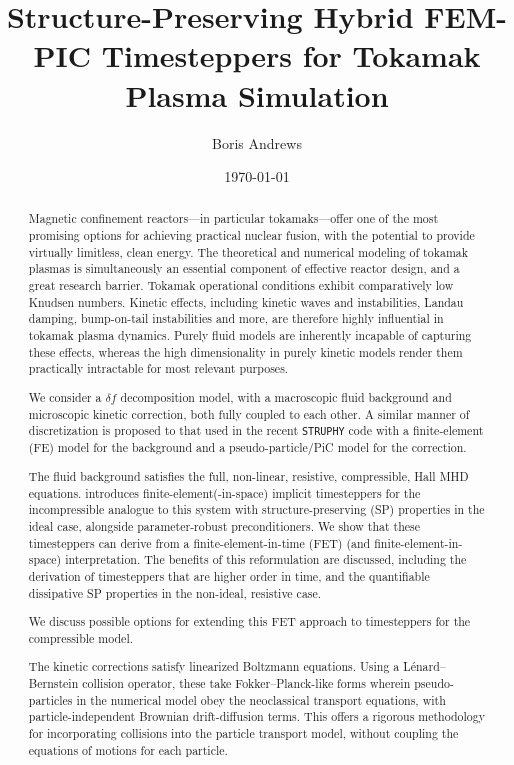\documentclass[12pt, a4paper]{report}
\title{Structure-Preserving Hybrid FEM-PIC Timesteppers for Tokamak Plasma Simulation}
\author{Boris Andrews}
\affil{Mathematical Institute, University of Oxford}
\date{\today}
\begin{document}
    \maketitle
    
    
    \begin{abstract}
        Magnetic confinement reactors---in particular tokamaks---offer one of the most promising options for achieving practical nuclear fusion, with the potential to provide virtually limitless, clean energy. The theoretical and numerical modeling of tokamak plasmas is simultaneously an essential component of effective reactor design, and a great research barrier. Tokamak operational conditions exhibit comparatively low Knudsen numbers. Kinetic effects, including kinetic waves and instabilities, Landau damping, bump-on-tail instabilities and more, are therefore highly influential in tokamak plasma dynamics. Purely fluid models are inherently incapable of capturing these effects, whereas the high dimensionality in purely kinetic models render them practically intractable for most relevant purposes.

        We consider a $\delta\!f$ decomposition model, with a macroscopic fluid background and microscopic kinetic correction, both fully coupled to each other. A similar manner of discretization is proposed to that used in the recent {\tt STRUPHY} code \cite{Holderied_Possanner_Wang_2021, Holderied_2022, Li_et_al_2023} with a finite-element (FE) model for the background and a pseudo-particle/PiC model for the correction.

        The fluid background satisfies the full, non-linear, resistive, compressible, Hall MHD equations. \cite{Laakmann_Hu_Farrell_2022} introduces finite-element(-in-space) implicit timesteppers for the incompressible analogue to this system with structure-preserving (SP) properties in the ideal case, alongside parameter-robust preconditioners. We show that these timesteppers can derive from a finite-element-in-time (FET) (and finite-element-in-space) interpretation. The benefits of this reformulation are discussed, including the derivation of timesteppers that are higher order in time, and the quantifiable dissipative SP properties in the non-ideal, resistive case.
        
        We discuss possible options for extending this FET approach to timesteppers for the compressible model.

        The kinetic corrections satisfy linearized Boltzmann equations. Using a Lénard--Bernstein collision operator, these take Fokker--Planck-like forms \cite{Fokker_1914, Planck_1917} wherein pseudo-particles in the numerical model obey the neoclassical transport equations, with particle-independent Brownian drift-diffusion terms. This offers a rigorous methodology for incorporating collisions into the particle transport model, without coupling the equations of motions for each particle.
        

\end{abstract}
\end{document}

